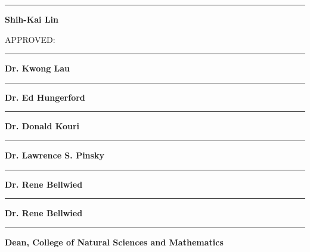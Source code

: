 \begin{flushright}
  \begin{minipage}[c]{0.6\textwidth}
  \vspace{2.0cm}
  
  \begin{spacing}{0}
  \rule{\textwidth}{0.5mm}
  \textbf{Shih-Kai Lin}\\
  \end{spacing}
  
  \vspace{1.5cm}
  APPROVED:\\
  \vspace{\baselineskip}
  
  \begin{spacing}{0}
  \rule{\textwidth}{0.5mm}
  \textbf{Dr. Kwong Lau}\\
  \end{spacing}
  \vspace{2.4cm}
  
  \begin{spacing}{0}
  \rule{\textwidth}{0.5mm}
  \textbf{Dr. Ed Hungerford}\\
  \end{spacing}
  \vspace{2.4cm}
  
  \begin{spacing}{0}
  \rule{\textwidth}{0.5mm}
  \textbf{Dr. Donald Kouri}\\
  \end{spacing}
  \vspace{2.4cm}
  
  \begin{spacing}{0}
  \rule{\textwidth}{0.5mm}
  \textbf{Dr. Lawrence S. Pinsky}\\
  \end{spacing}
  \vspace{2.4cm}
  
  \begin{spacing}{0}
  \rule{\textwidth}{0.5mm}
  \textbf{Dr. Rene Bellwied}\\
  \end{spacing}
  \vspace{2.4cm}
  
  \begin{spacing}{0}
  \rule{\textwidth}{0.5mm}
  \textbf{Dr. Rene Bellwied}\\
  \end{spacing}
  \vspace{2.4cm}
  
  \begin{spacing}{0}
  \rule{\textwidth}{0.5mm}
  \textbf{Dean, College of Natural Sciences and Mathematics}\\
  \end{spacing}
  
  \end{minipage}
\end{flushright}